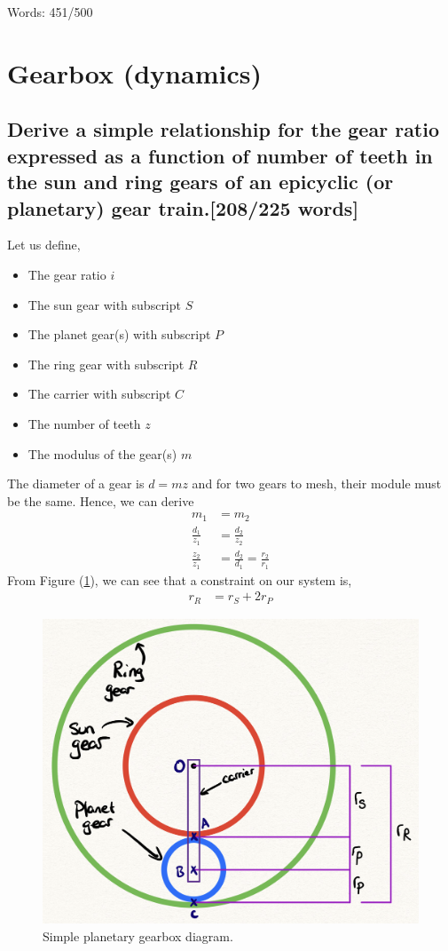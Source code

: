 \documentclass[12pt]{article}
\numberwithin{equation}{section}
\begin{document}
\begin{flushleft}
Words: 451/500

\section{Gearbox (dynamics)}
\subsection[Gear ratio derivation.]{Derive a simple relationship for the gear ratio expressed as a function of number of teeth in the sun and ring gears of an epicyclic (or planetary) gear train.[208/225 words]}
Let us define,
\begin{multicols}{2}
  \begin{itemize} 
    \item The gear ratio $i$
    \item The sun gear with subscript $S$
    \item The planet gear(s) with subscript $P$ 
    \item The ring gear with subscript $R$
    \item The carrier with subscript $C$
    \item The number of teeth $z$
    \item The modulus of the gear(s) $m$
  \end{itemize}
\end{multicols}
The diameter of a gear is $d = mz$ and for two gears to mesh, their module must be the same. Hence, we can derive
\begin{align}
  m_1 &= m_2\\
  \frac{d_1}{z_1} &= \frac{d_2}{z_2}\\
  \frac{z_2}{z_1} &= \frac{d_2}{d_1} = \frac{r_2}{r_1}
\end{align}
From Figure (\ref{SystemRadii}), we can see that a constraint on our system is,
\begin{align}
  r_R &= r_S + 2r_P
  \label{radiiRelationship}
\end{align}
\begin{figure}[H]
  \centering
  \includegraphics[width = 0.7 \textwidth]{./img/GearRadii.png}
  \caption{Simple planetary gearbox diagram.}
  \label{SystemRadii}
\end{figure}


\end{flushleft}
\end{document}
